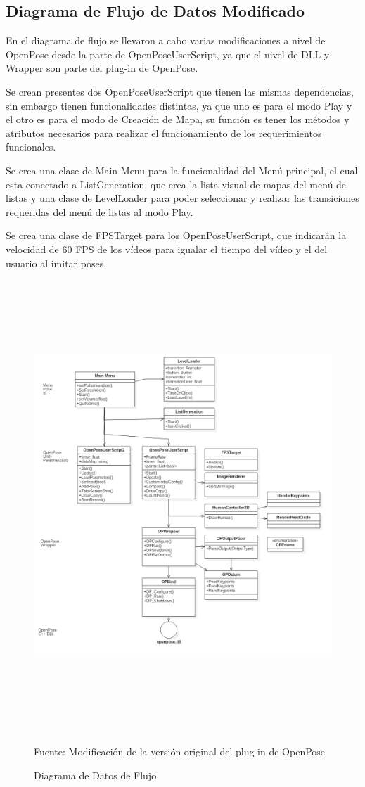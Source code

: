 \clearpage
\subsection{Diagrama de Flujo de Datos Modificado}

En el diagrama de flujo se llevaron a cabo varias modificaciones a nivel de OpenPose desde la parte de OpenPoseUserScript, ya que el nivel de DLL y Wrapper son parte del plug-in de OpenPose.

Se crean presentes dos OpenPoseUserScript que tienen las mismas dependencias, sin embargo tienen funcionalidades distintas, ya que uno es para el modo Play y el otro es para el modo de Creación de Mapa, su función es tener los métodos y atributos necesarios para realizar el funcionamiento de los requerimientos funcionales.

Se crea una clase de Main Menu para la funcionalidad del Menú principal, el cual esta conectado a ListGeneration, que crea la lista visual de mapas del menú de listas y una clase de LevelLoader para poder seleccionar y realizar las transiciones requeridas del menú de listas al modo Play.

Se crea una clase de FPSTarget para los OpenPoseUserScript, que indicarán la velocidad de 60 FPS de los vídeos para igualar el tiempo del vídeo y el del usuario al imitar poses.

\begin{figure}[h]
	\centering
	\includegraphics[width=14cm,height=17cm]{./Images/newdiagramadeflujo.jpg}
	\caption{Diagrama de Datos de Flujo}
	\footnotesize Fuente: Modificación de la versión original del plug-in de OpenPose\cite{8765346}
	\label{newdiagramadeflujo}
\end{figure}


